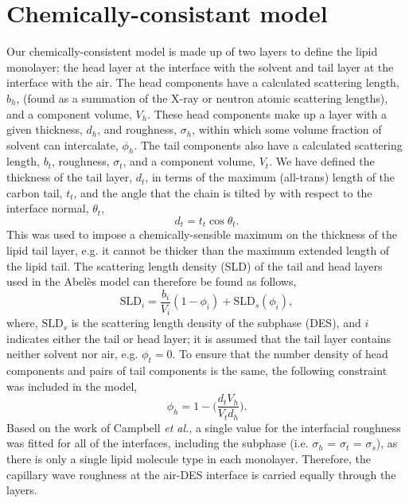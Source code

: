 \documentclass[11pt,a4paper]{paper}
\begin{document}
\section{Chemically-consistant model}
Our chemically-consistent model is made up of two layers to define the lipid monolayer; the head layer at the interface with the solvent and tail layer at the interface with the air. The head components have a calculated scattering length, $b_h$, (found as a summation of the X-ray or neutron atomic scattering lengths), and a component volume, $V_h$. These head components make up a layer with a given thickness, $d_h$, and roughness, $\sigma_h$, within which some volume fraction of solvent can intercalate, $\phi_h$. The tail components also have a calculated scattering length, $b_t$, roughness, $\sigma_t$, and a component volume, $V_t$. We have defined the thickness of the tail layer, $d_t$, in terms of the maximum (all-trans) length of the carbon tail, $t_t$, and the angle that the chain is tilted by with respect to the interface normal, $\theta_t$,
%
\begin{equation}
\label{equ:tl}
d_t = t_t \cos{\theta_t}.
\end{equation}
%
This was used to impose a chemically-sensible maximum on the thickness of the lipid tail layer, e.g. it cannot be thicker than the maximum extended length of the lipid tail. The scattering length density (SLD) of the tail and head layers used in the Abel\`{e}s model can therefore be found as follows,
%
\begin{equation}
\text{SLD}_i = \frac{b_i}{V_i}(1 - \phi_i) + \text{SLD}_{s}(\phi_i),
\end{equation}
%
where, $\text{SLD}_{s}$ is the scattering length density of the subphase (DES), and $i$ indicates either the tail or head layer; it is assumed that the tail layer contains neither solvent nor air, e.g. $\phi_t = 0$. To ensure that the number density of head components and pairs of tail components is the same, the following constraint was included in the model,\cite{Braun2017}
%
\begin{equation}
\label{equ:phih}
\phi_h =  1 - \bigg(\frac{d_tV_h}{V_td_h}\bigg).
\end{equation}
%
Based on the work of Campbell \emph{et al.},\cite{Campbell2018} a single value for the interfacial roughness was fitted for all of the interfaces, including the subphase (i.e. $\sigma_h$ = $\sigma_t$ = $\sigma_s$), as there is only a single lipid molecule type in each monolayer. Therefore, the capillary wave roughness at the air-DES interface is carried equally through the layers.
\end{document}
